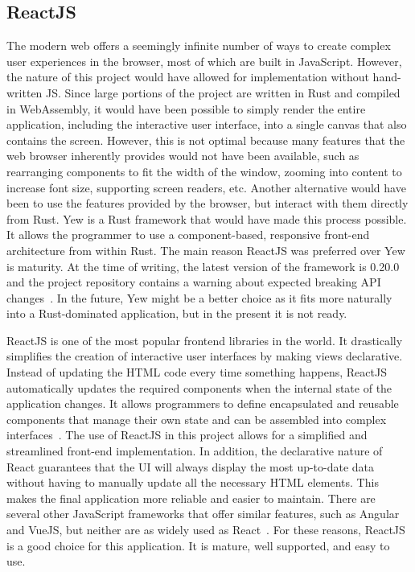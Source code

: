 \subsection{ReactJS}
The modern web offers a seemingly infinite number of ways to create complex user experiences in the browser, most of which are built in JavaScript.
However, the nature of this project would have allowed for implementation without hand-written JS. Since large portions of the project are written in Rust and compiled in WebAssembly, it would have been possible to simply render the entire application, including the interactive user interface, into a single canvas that also contains the screen.
However, this is not optimal because many features that the web browser inherently provides would not have been available, such as rearranging components to fit the width of the window, zooming into content to increase font size, supporting screen readers, etc.
Another alternative would have been to use the features provided by the browser, but interact with them directly from Rust.
Yew is a Rust framework that would have made this process possible. It allows the programmer to use a component-based, responsive front-end architecture from within Rust.
The main reason ReactJS was preferred over Yew is maturity. At the time of writing, the latest version of the framework is 0.20.0 and the project repository contains a warning about expected breaking API changes~\cite{yewweb}.
In the future, Yew might be a better choice as it fits more naturally into a Rust-dominated application, but in the present it is not ready.

ReactJS is one of the most popular frontend libraries in the world. It drastically simplifies the creation of interactive user interfaces by making views declarative.
Instead of updating the HTML code every time something happens, ReactJS automatically updates the required components when the internal state of the application changes.
It allows programmers to define encapsulated and reusable components that manage their own state and can be assembled into complex interfaces~\cite{reactweb}.
The use of ReactJS in this project allows for a simplified and streamlined front-end implementation.
In addition, the declarative nature of React guarantees that the UI will always display the most up-to-date data without having to manually update all the necessary HTML elements. This makes the final application more reliable and easier to maintain.
There are several other JavaScript frameworks that offer similar features, such as Angular and VueJS, but neither are as widely used as React~\cite{webframework}.
For these reasons, ReactJS is a good choice for this application. It is mature, well supported, and easy to use.


